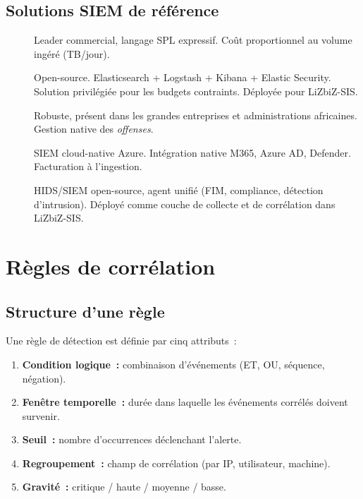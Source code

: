 \subsection{Solutions SIEM de référence}

\begin{description}
  \item[] Leader commercial, langage SPL expressif.
        Coût proportionnel au volume ingéré (TB/jour).
  \item[] Open-source. Elasticsearch + Logstash
        + Kibana + Elastic Security. Solution privilégiée pour les
        budgets contraints. Déployée pour LiZbiZ-SIS.
  \item[] Robuste, présent dans les grandes entreprises
        et administrations africaines. Gestion native des \textit{offenses}.
  \item[] SIEM cloud-native Azure.
        Intégration native M365, Azure AD, Defender. Facturation à l'ingestion.
  \item[] HIDS/SIEM open-source, agent unifié (FIM, compliance,
        détection d'intrusion). Déployé comme couche de collecte et de
        corrélation dans LiZbiZ-SIS.
\end{description}

\section{Règles de corrélation}
\label{sec:regles-correlation}

\subsection{Structure d'une règle}

Une règle de détection est définie par cinq attributs~:
\begin{enumerate}
  \item \textbf{Condition logique~:} combinaison d'événements (ET, OU, séquence,
        négation).
  \item \textbf{Fenêtre temporelle~:} durée dans laquelle les événements
        corrélés doivent survenir.
  \item \textbf{Seuil~:} nombre d'occurrences déclenchant l'alerte.
  \item \textbf{Regroupement~:} champ de corrélation (par IP, utilisateur,
        machine).
  \item \textbf{Gravité~:} critique / haute / moyenne / basse.
\end{enumerate}

